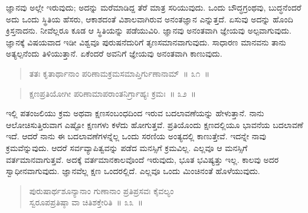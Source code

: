 \vspace{-0.3cm}


\vspace{0.1cm}

ಜ್ಞಾನವು ಅಲ್ಲೇ ಇರುವುದು; ಅದನ್ನು ಮರೆಮಾಡಿದ್ದ ತೆರೆ ಮಾತ್ರ ಸರಿಯುವುದು. ಒಂದು ಬೌದ್ಧಗ್ರಂಥವು, ಬುದ್ಧನೆಂದರೆ ಅದು ಒಂದು ಸ್ಥಿತಿಯ ಹೆಸರು, ಆಕಾಶದಂತೆ ವಿಶಾಲವಾಗಿರುವ ಅನಂತಜ್ಞಾನ ಎನ್ನುತ್ತದೆ. ಏಸುವು ಅದನ್ನು ಹೊಂದಿ ಕ್ರಿಸ್ತನಾದನು. ನೀವೆಲ್ಲರೂ ಕೂಡ ಆ ಸ್ಥಿತಿಯನ್ನು ಪಡೆಯುವಿರಿ. ಜ್ಞಾನವು ಅನಂತವಾಗಿ ಜ್ಞೇಯವು ಅಲ್ಪವಾಗುವುದು. ಜ್ಞಾನಕ್ಕೆ ವಿಷಯವಾದ ಇಡೀ ವಿಶ್ವವೂ ಪುರುಷನೆದುರಿಗೆ ತೃಣಸಮಾನವಾಗುವುದು. ಸಾಧಾರಣ ಮಾನವನು ತಾನು ಅತ್ಯಲ್ಪನೆಂದು ತಿಳಿಯುತ್ತಾನೆ. ಏಕೆಂದರೆ ಅವನಿಗೆ ಜ್ಞೇಯವು ಅನಂತವಾಗಿ ಕಾಣುವುದು.

\vspace{-0.3cm}

\begin{verse}
ತತಃ ಕೃತಾರ್ಥಾನಾಂ ಪರಿಣಾಮಕ್ರಮಸಮಾಪ್ತಿರ್ಗುಣಾನಾಮ್​~॥ ೩೧~॥
\end{verse}

\vspace{-0.33cm}


\vspace{-0.2cm}

\begin{verse}
ಕ್ಷಣಪ್ರತಿಯೋಗೀ ಪರಿಣಾಮಾಪರಾಂತನಿರ್ಗ್ರಾಹ್ಯಃ ಕ್ರಮಃ~॥ ೩೨~॥
\end{verse}

\vspace{-0.33cm}


\vspace{0.1cm}

ಇಲ್ಲಿ ಪತಂಜಲಿಯು ಕ್ರಮ ಅಥವಾ ಕ್ಷಣಸಂಬಂಧದಿಂದ ಇರುವ ಬದಲಾವಣೆಯನ್ನು ಹೇಳುತ್ತಾನೆ. ನಾನು ಆಲೋಚಿಸುತ್ತಿರುವಾಗ ಎಷ್ಟೋ ಕ್ಷಣಗಳು ಕಳೆದು ಹೋಗುತ್ತವೆ. ಪ್ರತಿಯೊಂದು ಕ್ಷಣದಲ್ಲಿಯೂ ಭಾವನೆಯ ಬದಲಾವಣೆ ಇದೆ. ಆದರೆ ನಾನು ಈ ಬದಲಾವಣೆಗಳನ್ನೆಲ್ಲ ಒಂದು ಸರಣಿಯ ಅಂತ್ಯದಲ್ಲಿ ಕಾಣುತ್ತೇವೆ. ಇದನ್ನೇ ನಾವು ಕ್ರಮವೆನ್ನುವುದು. ಆದರೆ ಸರ್ವವ್ಯಾಪಿತ್ವವನ್ನು ಪಡೆದ ಮನಸ್ಸಿಗೆ ಕ್ರಮವಿಲ್ಲ. ಎಲ್ಲವೂ ಆ ಮನಸ್ಸಿಗೆ ವರ್ತಮಾನವಾಗುತ್ತವೆ. ಅದಕ್ಕೆ ವರ್ತಮಾನಕಾಲವೊಂದೆ ಇರುವುದು, ಭೂತ ಭವಿಷ್ಯತ್ತು ಇಲ್ಲ. ಕಾಲವು ಅದರ ಸ್ವಾಧೀನವಾಗುವುದು. ಜ್ಞಾನವೆಲ್ಲ ಕ್ಷಣ ಒಂದರಲ್ಲಿದೆ. ಎಲ್ಲವೂ ಒಂದು ಮಿಂಚಿನಂತೆ ಹೊಳೆಯುವುದು.

\vspace{-0.2cm}

\begin{verse}
ಪುರುಷಾರ್ಥಶೂನ್ಯಾನಾಂ ಗುಣಾನಾಂ ಪ್ರತಿಪ್ರಸವಃ ಕೈವಲ್ಯಂ \\ಸ್ವರೂಪಪ್ರತಿಷ್ಠಾ ವಾ ಚಿತಿಶಕ್ತೇರಿತಿ~\hfill{॥ ೩೩~॥}
\end{verse}

